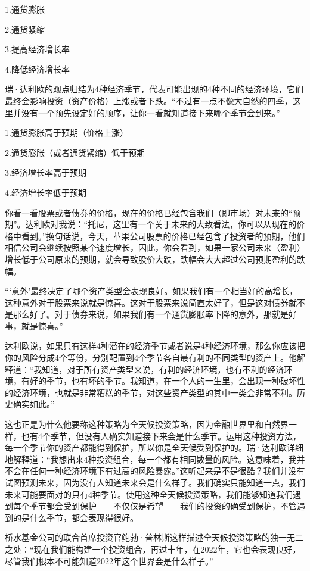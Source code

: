 1.通货膨胀

2.通货紧缩

3.提高经济增长率

4.降低经济增长率



瑞·达利欧的观点归结为4种经济季节，代表可能出现的4种不同的经济环境，它们最终会影响投资（资产价格）上涨或者下跌。“不过有一点不像大自然的四季，这里并没有一个预先设定好的顺序，让你一看就知道接下来哪个季节会到来。”

1.通货膨胀高于预期（价格上涨）

2.通货膨胀（或者通货紧缩）低于预期

3.经济增长率高于预期

4.经济增长率低于预期

你看一看股票或者债券的价格，现在的价格已经包含我们（即市场）对未来的“预期”。达利欧对我说：“托尼，这里有一个关于未来的大致看法，你可以从现在的价格中看到。”换句话说，今天，苹果公司股票的价格已经包含了投资者的预期，他们相信公司会继续按照某个速度增长，因此，你会看到，如果一家公司未来（盈利）增长低于公司原来的预期，就会导致股价大跌，跌幅会大大超过公司预期盈利的跌幅。

“‘意外’最终决定了哪个资产类型会表现良好。如果我们有一个相当好的高增长，这种意外对于股票来说就是惊喜。这对于股票来说简直太好了，但是这对债券就不是那么好了。对于债券来说，如果我们有一个通货膨胀率下降的意外，那就是好事，就是惊喜。”

达利欧说，如果只有这样4种潜在的经济季节或者说是4种经济环境，那么你应该把你的风险分成4个等份，分别配置到4个季节各自最有利的不同类型的资产上。他解释道：“我知道，对于所有资产类型来说，有利的经济环境，也有不利的经济环境，有好的季节，也有坏的季节。我知道，在一个人的一生里，会出现一种破坏性的经济环境，也就是非常糟糕的季节，对这些资产类型的其中一类会非常不利。历史确实如此。”

这也正是为什么他要称这种策略为全天候投资策略，因为金融世界里和自然界一样，也有4个季节，但没有人确实知道接下来会是什么季节。运用这种投资方法，每一个季节你的资产都能得到保护，所以你是全天候受到保护的。瑞·达利欧详细地解释道：“我想出来4种投资组合，每一个都有相同数量的风险。这意味着，我并不会在任何一种经济环境下有过高的风险暴露。”这听起来是不是很酷？我们并没有试图预测未来，因为没有人知道未来会是什么样子。我们确实只能知道一点，我们未来可能要面对的只有4种季节。使用这种全天候投资策略，我们能够知道我们遇到每个季节都会受到保护——不仅仅是希望——我们的投资的确受到保护，不管遇到的是什么季节，都会表现得很好。

桥水基金公司的联合首席投资官鲍勃·普林斯这样描述全天候投资策略的独一无二之处：“现在我们能构建一个投资组合，再过十年，在2022年，它也会表现良好，尽管我们根本不可能知道2022年这个世界会是什么样子。”

